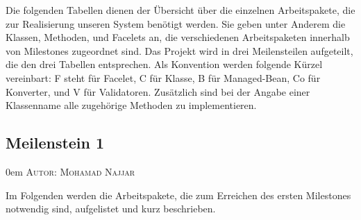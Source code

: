 \documentclass{article}
\makeatletter
\newcommand{\sectionauthor}[1]{
	{\parindent 0em \large \scshape Autor: #1 \par \nobreak \vspace*{1em}}
	\@afterheading
}
\makeatother
\begin{document}
Die folgenden Tabellen dienen der Übersicht über die einzelnen Arbeitspakete, die zur Realisierung unseren System benötigt werden.
Sie geben unter Anderem die Klassen, Methoden, und Facelets an, die verschiedenen Arbeitspaketen innerhalb von Milestones zugeordnet sind. 
Das Projekt wird in drei Meilensteilen aufgeteilt, die den drei Tabellen entsprechen.
Als Konvention werden folgende Kürzel vereinbart: F steht für Facelet, C für Klasse, B für Managed-Bean, Co für Konverter, und V für Validatoren.
Zusätzlich sind bei der Angabe einer Klassenname alle zugehörige Methoden zu implementieren. 


\subsection{Meilenstein 1}
\sectionauthor{Mohamad Najjar}

Im Folgenden werden die Arbeitspakete, die zum Erreichen des ersten Milestones notwendig sind, aufgelistet und kurz beschrieben. 
\end{document}
